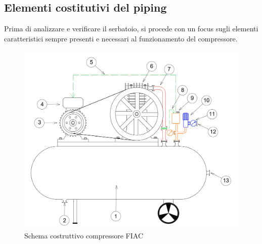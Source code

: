 \subsection{Elementi costitutivi del piping}
Prima di analizzare e verificare il serbatoio, si procede con un focus sugli elementi caratteristici sempre presenti e necessari al funzionamento del compressore. 
\begin{figure}[h]
    \centering
    \includegraphics[scale=0.4]{Immagini/AssiemePipingCompressore.png}
    \caption{Schema costruttivo compressore FIAC}
    \label{fig:AssiemePipingCompressore}
\end{figure}
\newpage
